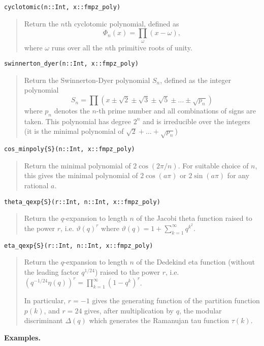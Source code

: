 \documentclass[a4paper,10pt]{article}
\newcommand{\desc}[1]{\vspace{-3mm}\begin{quote}#1\end{quote}}
\begin{document}
{{\begin{lstlisting}
cyclotomic(n::Int, x::fmpz_poly)
\end{lstlisting}

\desc{Return the $n$th cyclotomic polynomial, defined as
$$\Phi_n(x) = \prod_{\omega} (x-\omega),$$ where $\omega$ runs over all the 
$n$th primitive roots of unity.}

\begin{lstlisting}
swinnerton_dyer(n::Int, x::fmpz_poly)
\end{lstlisting}

\desc{Return the Swinnerton-Dyer polynomial $S_n$, defined as the integer 
polynomial $$S_n = \prod (x \pm \sqrt{2} \pm \sqrt{3}
\pm \sqrt{5} \pm \ldots \pm \sqrt{p_n})$$ where $p_n$ denotes the $n$-th prime 
number and all combinations of signs are taken. This polynomial has degree $2^n$
and is irreducible over the integers (it is the minimal polynomial of 
$\sqrt{2} + \ldots + \sqrt{p_n}$)}

\begin{lstlisting}
cos_minpoly{S}(n::Int, x::fmpz_poly)
\end{lstlisting}

\desc{Return the minimal polynomial of $2 \cos(2 \pi / n)$. For suitable choice of 
$n$, this gives the minimal polynomial of $2 \cos(a \pi)$ or $2 \sin(a \pi)$ for any
rational $a$.}

\begin{lstlisting}
theta_qexp{S}(r::Int, n::Int, x::fmpz_poly)
\end{lstlisting}

\desc{Return the $q$-expansion to length $n$ of the Jacobi theta function raised to 
the power $r$, i.e. $\vartheta(q)^r$ where 
$\vartheta(q) = 1 + \sum_{k=1}^{\infty} q^{k^2}$.}

\begin{lstlisting}
eta_qexp{S}(r::Int, n::Int, x::fmpz_poly)
\end{lstlisting}

\desc{Return the $q$-expansion to length $n$ of the Dedekind eta function (without 
the leading factor $q^{1/24}$) raised to the power $r$, i.e. $(q^{-1/24} \eta(q))^r 
= \prod_{k=1}^{\infty} (1 - q^k)^r$.

In particular, $r = -1$ gives the generating function of the partition function $p(k)$, 
and $r = 24$ gives, after multiplication by $q$, the modular discriminant $\Delta(q)$ 
which generates the Ramanujan tau function $\tau(k)$.}

\textbf{Examples.}

}}
\end{document}
